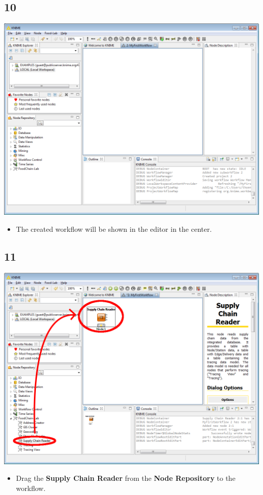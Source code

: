 \documentclass{beamer}
\begin{document}
\subsection{10}
\begin{frame}
	\begin{center}
  		\includegraphics[height=0.6\textheight]{10.png}
	\end{center}
	\begin{itemize}
		\item The created workflow will be shown in the editor in the center.
	\end{itemize}
\end{frame}

\subsection{11}
\begin{frame}
	\begin{center}
  		\includegraphics[height=0.6\textheight]{11.png}
	\end{center}
	\begin{itemize}
		\item Drag the \textbf{Supply Chain Reader} from the \textbf{Node Repository} to the workflow.
	\end{itemize}
\end{frame}
\end{document}
